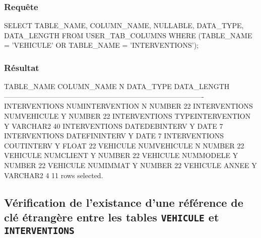 \documentclass[•]{article}
\begin{document}
\subsubsection{Requête}
\begin{sql}
 SELECT TABLE_NAME, COLUMN_NAME, NULLABLE, DATA_TYPE, DATA_LENGTH
 FROM USER_TAB_COLUMNS 
 WHERE (TABLE_NAME = 'VEHICULE' OR TABLE_NAME = 'INTERVENTIONS');
\end{sql}

\subsubsection{Résultat}
\begin{sql}
 TABLE_NAME            COLUMN_NAME               N		DATA_TYPE		DATA_LENGTH
-------------------------------------------------------------------------------------
INTERVENTIONS          NUMINTERVENTION           N		NUMBER	         22
INTERVENTIONS          NUMVEHICULE               Y		NUMBER	         22
INTERVENTIONS          TYPEINTERVENTION          Y		VARCHAR2         40
INTERVENTIONS          DATEDEBINTERV             Y		DATE	          7
INTERVENTIONS          DATEFININTERV             Y		DATE	          7
INTERVENTIONS          COUTINTERV                Y		FLOAT	         22
VEHICULE               NUMVEHICULE               N		NUMBER	         22
VEHICULE               NUMCLIENT                 Y		NUMBER	         22
VEHICULE               NUMMODELE                 Y		NUMBER	         22
VEHICULE               NUMIMMAT                  Y		NUMBER	         22
VEHICULE               ANNEE                     Y		VARCHAR2	      4
11 rows selected.
\end{sql}

\subsection{Vérification de l'existance d'une référence de clé étrangère entre les tables \texttt{VEHICULE} et \texttt{INTERVENTIONS}}
\end{document}
